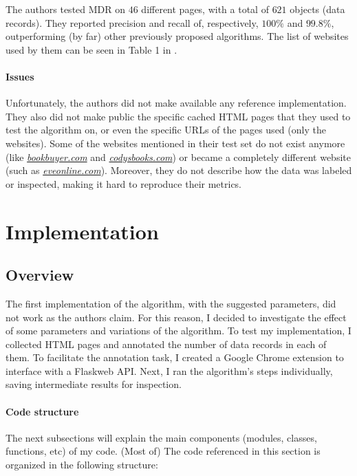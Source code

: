 \documentclass[10pt]{article}
\begin{document}
The authors tested MDR on $46$ different pages, with a total of $621$ objects (data records). They reported precision and recall of, respectively, $100\%$ and $99.8\%$, outperforming (by far) other previously proposed algorithms. The list of websites used by them can be seen in Table 1 in \cite{mdr}. 

\paragraph{Issues}

Unfortunately, the authors did not make available any reference implementation. They also did not make public the specific cached HTML pages that they used to test the algorithm on, or even the specific URLs of the pages used (only the websites). Some of the websites mentioned in their test set do not exist anymore (like \href{http://www.bookbuyer.com}{\textit{bookbuyer.com}} and \href{http://www.codysbooks.com}{\textit{codysbooks.com}}) or became a completely different website (such as \href{https://www.eveonline.com/}{\textit{eveonline.com}}). Moreover, they do not describe how the data was labeled or inspected, making it hard to reproduce their metrics.



\section{Implementation} \label{txt:implementation}

\subsection{Overview}

The first implementation of the algorithm, with the suggested parameters, did not work as the authors claim. For this reason, I decided to investigate the effect of some parameters and variations of the algorithm. To test my implementation, I collected HTML pages and annotated the number of data records in each of them. To facilitate the annotation task, I created a Google Chrome extension to interface with a Flask\footnotemark web API. Next, I ran the algorithm's steps individually, saving intermediate results for inspection.


\paragraph{Code structure} The next subsections will explain the main components (modules, classes, functions, etc) of my code. (Most of) The code referenced in this section is organized in the following structure\footnotemark:
\end{document}
